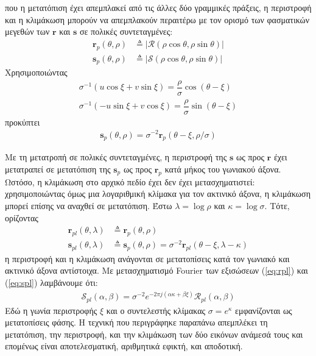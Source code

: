 που η μετατόπιση έχει απεμπλακεί από τις άλλες δύο γραμμικές πράξεις, η
περιστροφή και η κλιμάκωση μπορούν να απεμπλακούν περαιτέρω με τον ορισμό των
φασματικών μεγεθών των $\bm{r}$ και $\bm{s}$ σε πολικές συντεταγμένες:
\begin{align}
  \bm{r}_p(\theta,\rho) &\triangleq |\mathcal{R} (\rho\cos\theta, \rho\sin\theta)| \nonumber \\
  \bm{s}_p(\theta,\rho) &\triangleq |\mathcal{S} (\rho\cos\theta, \rho\sin\theta)| \nonumber
\end{align}
Χρησιμοποιώντας
\begin{align}
  \sigma^{-1} (u\cos\xi+ v\sin\xi) = \dfrac{\rho}{\sigma} \cos(\theta - \xi) \nonumber \\
  \sigma^{-1} (-u\sin\xi+ v\cos\xi) = \dfrac{\rho}{\sigma} \sin(\theta - \xi) \nonumber
\end{align}
προκύπτει
\begin{align}
  \bm{s}_p(\theta,\rho) = \sigma^{-2} \bm{r}_p (\theta-\xi, \rho/\sigma) \nonumber
\end{align}

Με τη μετατροπή σε πολικές συντεταγμένες, η περιστροφή της $\bm{s}$ ως προς
$\bm{r}$ έχει μετατραπεί σε μετατόπιση της $\bm{s}_p$ ως προς
$\bm{r}_p$ κατά μήκος του γωνιακού άξονα. Ωστόσο, η κλιμάκωση στο αρχικό πεδίο
έχει δεν έχει μετασχηματιστεί: χρησιμοποιώντας όμως μια λογαριθμική κλίμακα για
τον ακτινικό άξονα, η κλιμάκωση μπορεί επίσης να αναχθεί σε μετατόπιση. Έστω
$\lambda = \log\rho$ και $\kappa = \log\sigma$. Τότε, ορίζοντας
\begin{align}
  \bm{r}_{pl}(\theta, \lambda) &\triangleq \bm{r}_p(\theta,\rho) \label{eq:rpl} \\
  \bm{s}_{pl}(\theta, \lambda) &\triangleq \bm{s}_p(\theta,\rho) = \sigma^{-2} \bm{r}_{pl} (\theta-\xi, \lambda - \kappa) \label{eq:spl}
\end{align}
η περιστροφή και η κλιμάκωση ανάγονται σε μετατοπίσεις κατά τον γωνιακό και
ακτινικό άξονα αντίστοιχα. Με μετασχηματισμό Fourier των εξισώσεων (\ref{eq:rpl})
και (\ref{eq:spl}) λαμβάνουμε ότι:
\begin{align}
  \mathcal{S}_{pl}(\alpha,\beta) = \sigma^{-2} e^{-2 \pi j(\alpha\kappa + \beta\xi)} \mathcal{R}_{pl}(\alpha,\beta) \nonumber
\end{align}
Εδώ η γωνία περιστροφής $\xi$ και ο συντελεστής κλίμακας $\sigma = e^{\kappa}$
εμφανίζονται ως μετατοπίσεις φάσης. Η τεχνική που περιγράφηκε παραπάνω
απεμπλέκει τη μετατόπιση, την περιστροφή, και την κλιμάκωση των δύο εικόνων
ανάμεσά τους και επομένως είναι αποτελεσματική, αριθμητικά εφικτή, και
αποδοτική.

